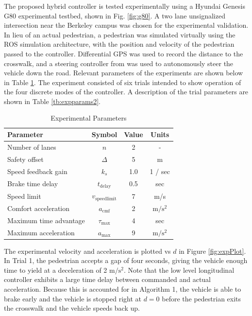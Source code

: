 \documentclass[letterpaper, 10 pt, conference]{ieeeconf} %
\begin{document}
The proposed hybrid controller is tested experimentally using a Hyundai Genesis G80 experimental testbed, shown in Fig. \ref{fig:g80}. A two lane unsignalized intersection near the Berkeley campus was chosen for the experimental validation. In lieu of an actual pedestrian, a pedestrian was simulated virtually using the ROS simulation architecture, with the position and velocity of the pedestrian passed to the controller. Differential GPS was used to record the distance to the crosswalk, and a steering controller from \cite{Kapania2015} was used to autonomously steer the vehicle down the road. Relevant parameters of the experiments are shown below in Table \ref{tb:expparams}. The experiment consisted of six trials intended to show operation of the four discrete modes of the controller. A description of the trial parameters are shown in Table \ref{tb:expparams2}. 

\begin{table}[h]
\begin{center}
\caption{Experimental Parameters}\label{tb:expparams}
\begin{tabular}{lccc}
Parameter & Symbol & Value & Units \\\hline\hline
Number of lanes & $n$ & 2 & - \\
Safety offset  & $\Delta$ & 5 & m \\
Speed feedback gain & $k_s$ & 1.0 & 1 / sec\\
Brake time delay  & $t_\mathrm{delay}$ & 0.5 & sec \\ 
Speed limit & $v_\mathrm{speedlimit}$ & 7 & m/s \\
Comfort acceleration & $a_\mathrm{cmf}$ & 2 & $\mathrm{m/s^2}$ \\
Maximum time advantage & $\tau_\mathrm{max}$ & 4 & sec \\
Maximum acceleration & $a_\mathrm{max}$ & 9 & $\mathrm{m/s^2}$ \\\hline
\end{tabular}
\end{center}
\end{table}

The experimental velocity and acceleration is plotted vs $d$ in Figure \ref{fig:expPlot}. In Trial 1, the pedestrian accepts a gap of four seconds, giving the vehicle enough time to yield at a deceleration of 2 $\mathrm{m/s^2}$. Note that the low level longitudinal controller exhibits a large time delay between commanded and actual acceleration. Because this is accounted for in Algorithm 1, the vehicle is able to brake early and the vehicle is stopped right at $d=0$ before the pedestrian exits the crosswalk and the vehicle speeds back up. 
\end{document}

